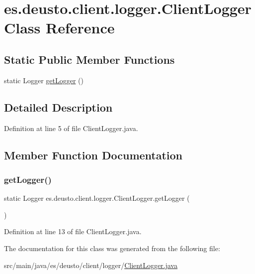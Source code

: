 \hypertarget{classes_1_1deusto_1_1client_1_1logger_1_1_client_logger}{}\section{es.\+deusto.\+client.\+logger.\+Client\+Logger Class Reference}
\label{classes_1_1deusto_1_1client_1_1logger_1_1_client_logger}
\subsection*{Static Public Member Functions}
\begin{DoxyCompactItemize}
\item 
static Logger \mbox{\hyperlink{classes_1_1deusto_1_1client_1_1logger_1_1_client_logger_a35927573d2e2138960e27bbd4009d4e5}{get\+Logger}} ()
\end{DoxyCompactItemize}


\subsection{Detailed Description}


Definition at line 5 of file Client\+Logger.\+java.



\subsection{Member Function Documentation}
\mbox{\label{classes_1_1deusto_1_1client_1_1logger_1_1_client_logger_a35927573d2e2138960e27bbd4009d4e5}} 
\subsubsection{\texorpdfstring{getLogger()}{getLogger()}}
{\footnotesize\ttfamily static Logger es.\+deusto.\+client.\+logger.\+Client\+Logger.\+get\+Logger (\begin{DoxyParamCaption}{ }\end{DoxyParamCaption})\hspace{0.3cm}{\ttfamily [static]}}



Definition at line 13 of file Client\+Logger.\+java.



The documentation for this class was generated from the following file\+:\begin{DoxyCompactItemize}
\item 
src/main/java/es/deusto/client/logger/\mbox{\hyperlink{_client_logger_8java}{Client\+Logger.\+java}}\end{DoxyCompactItemize}

